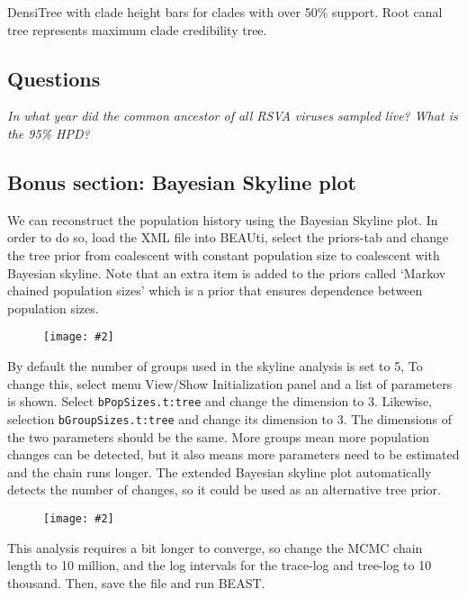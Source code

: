 \documentclass[12pt]{article}
\newcommand{\includeimage}[2][]{%
\texttt{[image: \#2]}
}
\begin{document}
DensiTree with clade height bars for clades with over 50\% support.
Root canal tree represents maximum clade credibility tree.


\subsection*{Questions}

\textit{In what year did the common ancestor of all RSVA viruses sampled live? What is the
95\% HPD?}



\subsection*{Bonus section: Bayesian Skyline plot}

We can reconstruct the population history using the Bayesian Skyline plot. In order to do so,
load the XML file into BEAUti, select the priors-tab and change the tree prior from 
coalescent with constant population size to coalescent with Bayesian skyline.
Note that an extra item is added to the priors called `Markov chained population sizes'
which is a prior that ensures dependence between population sizes.

\begin{figure}
\centering	
\includeimage[scale=0.5,clip=true,trim=0 0 0 0]{figures/BEAUti_priors2}
\label{fig:BEAUti_priors2}
\end{figure}

By default the number of groups used in the skyline analysis is set to 5, To change this,
select menu View/Show Initialization panel and a list of parameters is shown. Select
{\tt bPopSizes.t:tree} and change the dimension to 3. Likewise, selection {\tt bGroupSizes.t:tree}
and change its dimension to 3. The dimensions of the two parameters should be the same.
More groups mean more population changes can be detected, but it also means more parameters
need to be estimated and the chain runs longer. The extended Bayesian skyline plot
automatically detects the number of changes, so it could be used as an alternative
tree prior.

\begin{figure}
\centering	
\includeimage[scale=0.5,clip=true,trim=0 0 0 0]{figures/BEAUti_init}
\label{fig:BEAUti_init}
\end{figure}


This analysis requires a bit longer to converge, so change the MCMC chain length to 10 million,
and the log intervals for the trace-log and tree-log to 10 thousand. 
Then, save the file and run BEAST.
\end{document}
